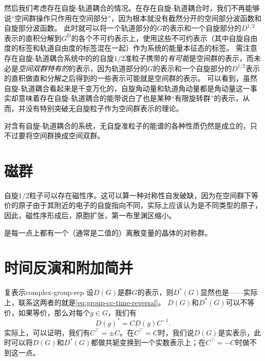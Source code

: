 然后我们考虑存在自旋-轨道耦合的情况。在存在自旋-轨道耦合时，我们不再能够说“空间群操作只作用在空间部分”，因为根本就没有截然分开的空间部分波函数和自旋部分波函数。
此时就可以将一个轨道部分的$G$的表示和一个自旋部分的$D^{1/2}$表示的直积分解到$G^\text{D}$的各个不可约表示上，使用这些不可约表示（其中自旋自由度的标签和轨道自由度的标签混在一起）作为系统的能量本征态的标签。
需注意存在自旋-轨道耦合系统中的的自旋$1/2$准粒子携带的\emph{有可能}是空间群的表示，而未必是\emph{空间双群特有的}的表示，因为轨道部分的$G$的表示和一个自旋部分的$D^{1/2}$表示的直积做直和分解之后得到的一些表示可能就是空间群的表示。
可以看到，虽然自旋-轨道耦合看起来是千变万化的，自旋角动量和轨道角动量都是角动量这一事实却意味着存在自旋-轨道耦合的能带说白了也是某种“有限旋转群”的表示，从而，并没有特别突破无自旋粒子作为空间群表示的理论。

对含有自旋-轨道耦合的系统，无自旋准粒子的能谱的各种性质仍然是成立的，只不过要将空间群换成空间双群。

\section{磁群}

自旋$1/2$粒子可以存在磁性序。这可以算一种对称性自发破缺，因为在空间群下等价的原子由于其附近的电子的自旋指向不同，实际上应该认为是不同类型的原子，因此，磁性序形成后，原胞扩张，第一布里渊区缩小。

是每一点上都有一个（通常是二值的）离散变量的晶体的对称群。

\section{时间反演和附加简并} %

\begin{back}{复表示}{complex-group-rep}
    设$D(G)$是群$G$的表示，则$D^*(G)$显然也是——实际上，联系这两者的就是\eqref{eq:group-cc-time-reversal}。
    $D(G)$和$D^*(G)$可以不等价，如果等价，那么对每个$g \in G$，我们有
    \[
        D(g)^* = C D(g) C^{-1}.
    \]
    实际上，可以证明，我们有$C^\top = \pm C$。在$C^\top = C$时，我们说$D(G)$是实表示，此时可以将$D(G)$和$D^*(G)$都做共轭变换到一个实数表示上；在$C^\top = - C$时做不到这一点。
\end{back}

